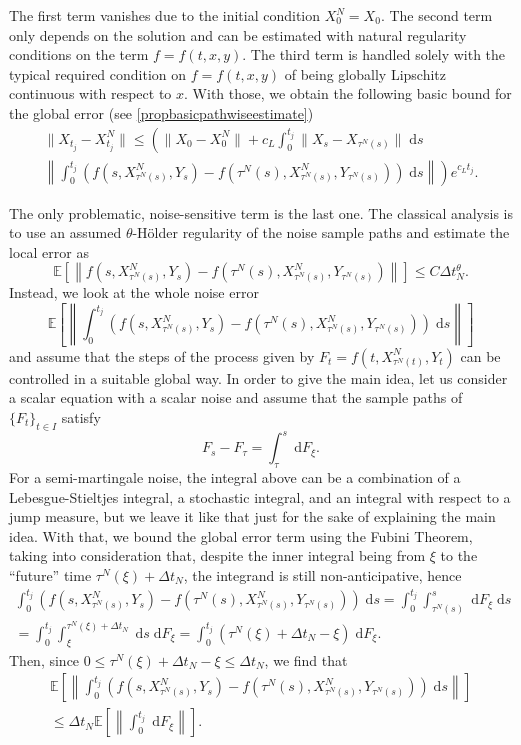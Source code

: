 \documentclass[reqno,12pt]{amsart}
\theoremstyle{plain} %
\theoremstyle{definition} %
\begin{document}
The first term vanishes due to the initial condition $X_0^N = X_0$. The second term only depends on the solution and can be estimated with natural regularity conditions on the term $f=f(t, x, y)$. The third term is handled solely with the typical required condition on $f=f(t, x, y)$ of being globally Lipschitz continuous with respect to $x$. With those, we obtain the following basic bound for the global error (see \cref{propbasicpathwiseestimate})
\begin{multline}
    \label{Etjbasicboundintro}
        \|X_{t_j} - X_{t_j}^N\| \leq \left( \|X_0 - X_0^N\| + c_L \int_0^{t_j} \|X_s - X_{\tau^N(s)}\| \;\mathrm{d}s \right. \\
        \left. \left\|\int_0^{t_j} \left( f(s, X_{\tau^N(s)}^N, Y_s) - f(\tau^N(s), X_{\tau^N(s)}^N, Y_{\tau^N(s)}) \right)\;\mathrm{d}s\right\|\right) e^{c_L t_j}.
\end{multline}

The only problematic, noise-sensitive term is the last one. The classical analysis is to use an assumed $\theta$-H\"older regularity of the noise sample paths and estimate the local error as
\[
    \mathbb{E}\left[\left\|f(s, X_{\tau^N(s)}^N, Y_s) - f(\tau^N(s), X_{\tau^N(s)}^N, Y_{\tau^N(s)})\right\|\right] \leq C\Delta t_N^{\theta}.
\]
Instead, we look at the whole noise error 
\[
    \mathbb{E}\left[\left\|\int_0^{t_j} \left( f(s, X_{\tau^N(s)}^N, Y_s) - f(\tau^N(s), X_{\tau^N(s)}^N, Y_{\tau^N(s)}) \right)\;\mathrm{d}s\right\|\right]
\]
and assume that the steps of the process given by $F_t = f(t, X_{\tau^N(t)}^N, Y_t)$ can be controlled in a suitable global way. In order to give the main idea, let us consider a scalar equation with a scalar noise and assume that the sample paths of $\{F_t\}_{t\in I}$ satisfy
\[
    F_s - F_\tau = \int_\tau^s \;\mathrm{d}F_\xi.
\]
For a semi-martingale noise, the integral above can be a combination of a Lebesgue-Stieltjes integral, a stochastic integral, and an integral with respect to a jump measure, but we leave it like that just for the sake of explaining the main idea. With that, we bound the global error term using the Fubini Theorem, taking into consideration that, despite the inner integral being from $\xi$ to the ``future'' time $\tau^N(\xi) + \Delta t_N$, the integrand is still non-anticipative, hence
\begin{multline*}
    \int_0^{t_j} \left( f(s, X_{\tau^N(s)}^N, Y_s) - f(\tau^N(s), X_{\tau^N(s)}^N, Y_{\tau^N(s)}) \right)\;\mathrm{d}s = \int_0^{t_j} \int_{\tau^N(s)}^s \;\mathrm{d}  F_\xi\;\mathrm{d}s \\
    = \int_0^{t_j} \int_{\xi}^{\tau^N(\xi) + \Delta t_N} \;\mathrm{d}s \;\mathrm{d} F_\xi  = \int_0^{t_j} (\tau^N(\xi) + \Delta t_N - \xi) \;\mathrm{d} F_\xi.
\end{multline*}
Then, since $0 \leq \tau^N(\xi) + \Delta t_N - \xi \leq \Delta t_N$, we find that
\begin{multline*}
    \mathbb{E}\left[\left\| \int_0^{t_j} \left( f(s, X_{\tau^N(s)}^N, Y_s) - f(\tau^N(s), X_{\tau^N(s)}^N, Y_{\tau^N(s)}) \right)\;\mathrm{d}s\right\|\right] \\
    \leq \Delta t_N\mathbb{E}\left[\left\| \int_0^{t_j} \;\mathrm{d} F_\xi \right\|\right].
\end{multline*}
\end{document}
